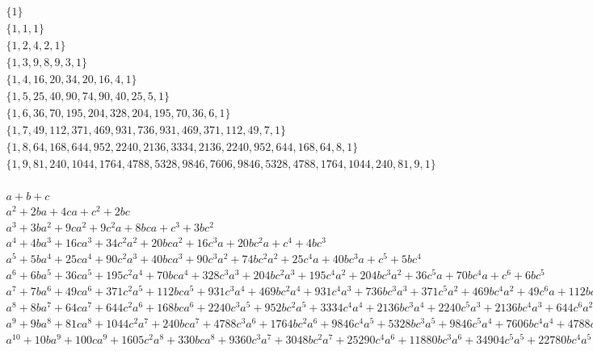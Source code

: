 $
\begin{array}{c}
\{1\} \\
\{1,1,1\} \\
\{1,2,4,2,1\} \\
\{1,3,9,8,9,3,1\} \\
\{1,4,16,20,34,20,16,4,1\} \\
\{1,5,25,40,90,74,90,40,25,5,1\} \\
\{1,6,36,70,195,204,328,204,195,70,36,6,1\} \\
\{1,7,49,112,371,469,931,736,931,469,371,112,49,7,1\} \\
\{1,8,64,168,644,952,2240,2136,3334,2136,2240,952,644,168,64,8,1\} \\
\{1,9,81,240,1044,1764,4788,5328,9846,7606,9846,5328,4788,1764,1044,240,81,9,1\} \\
\end{array}
$

\newpage
$
\begin{array}{c}
a+b+c \\
a^2+2 b a+4 c a+c^2+2 b c \\
a^3+3 b a^2+9 c a^2+9 c^2 a+8 b c a+c^3+3 b c^2 \\
a^4+4 b a^3+16 c a^3+34 c^2 a^2+20 b c a^2+16 c^3 a+20 b c^2 a+c^4+4 b c^3 \\
a^5+5 b a^4+25 c a^4+90 c^2 a^3+40 b c a^3+90 c^3 a^2+74 b c^2 a^2+25 c^4 a+40 b c^3 a+c^5+5 b c^4 \\
a^6+6 b a^5+36 c a^5+195 c^2 a^4+70 b c a^4+328 c^3 a^3+204 b c^2 a^3+195 c^4 a^2+204 b c^3 a^2+36 c^5 a+70 b c^4 a+c^6+6 b c^5 \\
a^7+7 b a^6+49 c a^6+371 c^2 a^5+112 b c a^5+931 c^3 a^4+469 b c^2 a^4+931 c^4 a^3+736 b c^3 a^3+371 c^5 a^2+469 b c^4 a^2+49 c^6 a+112 b c^5 a+c^7+7 b c^6 \\
a^8+8 b a^7+64 c a^7+644 c^2 a^6+168 b c a^6+2240 c^3 a^5+952 b c^2 a^5+3334 c^4 a^4+2136 b c^3 a^4+2240 c^5 a^3+2136 b c^4 a^3+644 c^6 a^2+952 b c^5 a^2+64 c^7 a+168 b c^6 a+c^8+8 b c^7 \\
a^9+9 b a^8+81 c a^8+1044 c^2 a^7+240 b c a^7+4788 c^3 a^6+1764 b c^2 a^6+9846 c^4 a^5+5328 b c^3 a^5+9846 c^5 a^4+7606 b c^4 a^4+4788 c^6 a^3+5328 b c^5 a^3+1044 c^7 a^2+1764 b c^6 a^2+81 c^8 a+240 b c^7 a+c^9+9 b c^8 \\
a^{10}+10 b a^9+100 c a^9+1605 c^2 a^8+330 b c a^8+9360 c^3 a^7+3048 b c^2 a^7+25290 c^4 a^6+11880 b c^3 a^6+34904 c^5 a^5+22780 b c^4 a^5+25290 c^6 a^4+22780 b c^5 a^4+9360 c^7 a^3+11880 b c^6 a^3+1605 c^8 a^2+3048 b c^7 a^2+100 c^9 a+330 b c^8 a+c^{10}+10 b c^9 \\
\end{array}
$